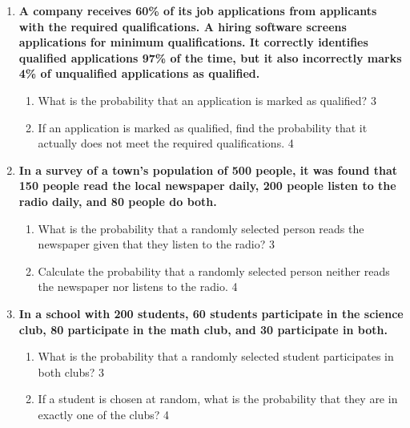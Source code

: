 \documentclass[a4paper,oneside]{book}
\begin{document}
\begin{enumerate}
  \begin{enumerate}
    \item
	What is a disjoint event? \hfill 1
    \item
	For two independent events, what does the Bayes' theorem reduce to? \hfill 2
    \item  
	What is the probability that a mail is tagged as spam?  \hfill 3
    \item
	If a certain mail is tagged as spam, find the probability that it is not a spam mail. \hfill 4
  \end{enumerate}
  
  \item
  \textbf{A company receives 60\% of its job applications from applicants with
  the required qualifications. A hiring software screens applications for minimum qualifications. It correctly identifies qualified applications 97\% of the time, but it also incorrectly marks 4\% of unqualified applications as qualified.}
  
  \begin{enumerate}
   \item  
    What is the probability that an application is marked as qualified? \hfill 3
   \item
    If an application is marked as qualified, find the probability that it actually does not meet the required qualifications. \hfill 4
  \end{enumerate}

\item
  \textbf{In a survey of a town's population of 500 people, it was found that 150 people read the local newspaper daily, 200 people listen to the radio daily, and 80 people do both.}
 
  \begin{enumerate}
    \item
    	What is the probability that a randomly selected person reads the newspaper given that they listen to the radio? \hfill 3
    \item
    	Calculate the probability that a randomly selected person neither reads the newspaper nor listens to the radio. \hfill 4
  \end{enumerate}

\item
  \textbf{In a school with 200 students, 60 students participate in the science 
  club, 80 participate in the math club, and 30 participate in both.}
 
  \begin{enumerate}
    \item
    	What is the probability that a randomly selected student participates in both clubs? \hfill 3
    \item
    	If a student is chosen at random, what is the probability that they are in exactly one of the clubs? \hfill 4
  \end{enumerate}


\end{enumerate}
\end{document}
